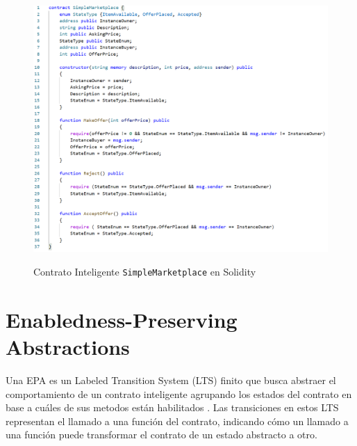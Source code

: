 \begin{figure}
    \centering
    {\includegraphics[width=\textwidth]{figs/simple-marketplace.png}}
    \caption{Contrato Inteligente \texttt{SimpleMarketplace} en Solidity}
    \label{fig:solidity-example}
\end{figure}

\section{Enabledness-Preserving Abstractions}


Una EPA es un Labeled Transition System (LTS) finito que busca abstraer el comportamiento de un contrato inteligente agrupando los estados del contrato en base a cuáles de sus metodos están habilitados \cite{de-caso-epa}.
Las transiciones en estos LTS representan el llamado a una función del contrato, indicando cómo un llamado a una función puede transformar el contrato de un estado abstracto a otro.

